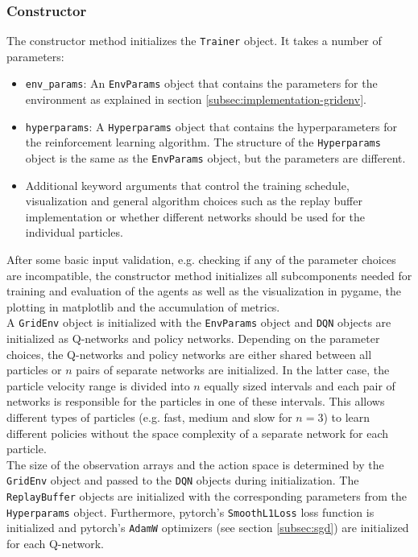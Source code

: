 \subsubsection{Constructor}
The constructor method initializes the \texttt{Trainer} object. It takes a number of parameters:
\begin{itemize}
    \item \texttt{env\_params}: An \texttt{EnvParams} object that contains the parameters for the environment as explained in section \ref{subsec:implementation-gridenv}.
    \item \texttt{hyperparams}: A \texttt{Hyperparams} object that contains the hyperparameters for the reinforcement learning algorithm. The structure of the \texttt{Hyperparams} object is the same as the \texttt{EnvParams} object, but the parameters are different.
    \item Additional keyword arguments that control the training schedule, visualization and general algorithm choices such as the replay buffer implementation or whether different networks should be used for the individual particles.
\end{itemize}
After some basic input validation, e.g. checking if any of the parameter choices are incompatible, the constructor method initializes all subcomponents needed for training and evaluation of the agents as well as the visualization in pygame, the plotting in matplotlib and the accumulation of metrics.
\\
A \texttt{GridEnv} object is initialized with the \texttt{EnvParams} object and \texttt{DQN} objects are initialized as Q-networks and policy networks. Depending on the parameter choices, the Q-networks and policy networks are either shared between all particles or $n$ pairs of separate networks are initialized. In the latter case, the particle velocity range is divided into $n$ equally sized intervals and each pair of networks is responsible for the particles in one of these intervals. This allows different types of particles (e.g. fast, medium and slow for $n=3$) to learn different policies without the space complexity of a separate network for each particle.
\\
The size of the observation arrays and the action space is determined by the \texttt{GridEnv} object and passed to the \texttt{DQN} objects during initialization. The \texttt{ReplayBuffer} objects are initialized with the corresponding parameters from the \texttt{Hyperparams} object. Furthermore, pytorch's \texttt{SmoothL1Loss} loss function is initialized and pytorch's \texttt{AdamW} optimizers (see section \ref{subsec:sgd}) are initialized for each Q-network. 


